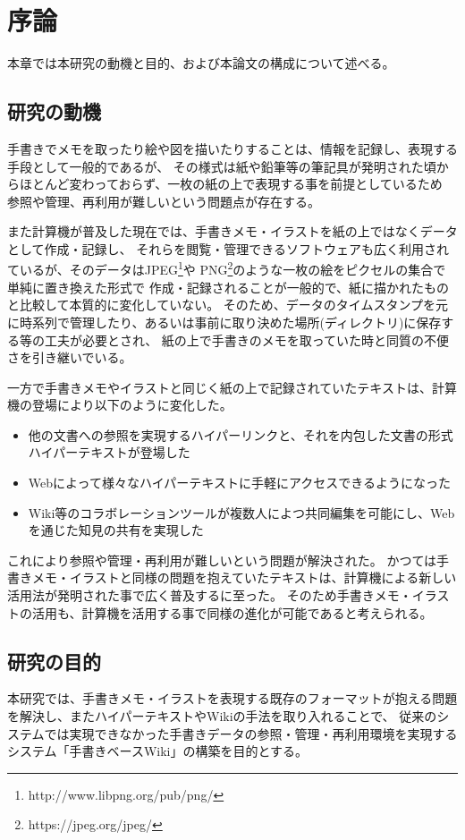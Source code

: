 \chapter{序論}
\label{chap:introduction}

本章では本研究の動機と目的、および本論文の構成について述べる。

\newpage

\section{研究の動機}

手書きでメモを取ったり絵や図を描いたりすることは、情報を記録し、表現する手段として一般的であるが、
その様式は紙や鉛筆等の筆記具が発明された頃からほとんど変わっておらず、一枚の紙の上で表現する事を前提としているため
参照や管理、再利用が難しいという問題点が存在する。

また計算機が普及した現在では、手書きメモ・イラストを紙の上ではなくデータとして作成・記録し、
それらを閲覧・管理できるソフトウェアも広く利用されているが、そのデータはJPEG\footnote{http://www.libpng.org/pub/png/}や
PNG\footnote{https://jpeg.org/jpeg/}のような一枚の絵をピクセルの集合で単純に置き換えた形式で
作成・記録されることが一般的で、紙に描かれたものと比較して本質的に変化していない。
そのため、データのタイムスタンプを元に時系列で管理したり、あるいは事前に取り決めた場所(ディレクトリ)に保存する等の工夫が必要とされ、
紙の上で手書きのメモを取っていた時と同質の不便さを引き継いでいる。

一方で手書きメモやイラストと同じく紙の上で記録されていたテキストは、計算機の登場により以下のように変化した。

\begin{itemize}
    \item 他の文書への参照を実現するハイパーリンクと、それを内包した文書の形式ハイパーテキストが登場した
    \item Webによって様々なハイパーテキストに手軽にアクセスできるようになった
    \item Wiki等のコラボレーションツールが複数人によつ共同編集を可能にし、Webを通じた知見の共有を実現した
\end{itemize}

これにより参照や管理・再利用が難しいという問題が解決された。
かつては手書きメモ・イラストと同様の問題を抱えていたテキストは、計算機による新しい活用法が発明された事で広く普及するに至った。
そのため手書きメモ・イラストの活用も、計算機を活用する事で同様の進化が可能であると考えられる。

\section{研究の目的}
本研究では、手書きメモ・イラストを表現する既存のフォーマットが抱える問題を解決し、またハイパーテキストやWikiの手法を取り入れることで、
従来のシステムでは実現できなかった手書きデータの参照・管理・再利用環境を実現するシステム「手書きベースWiki」の構築を目的とする。

